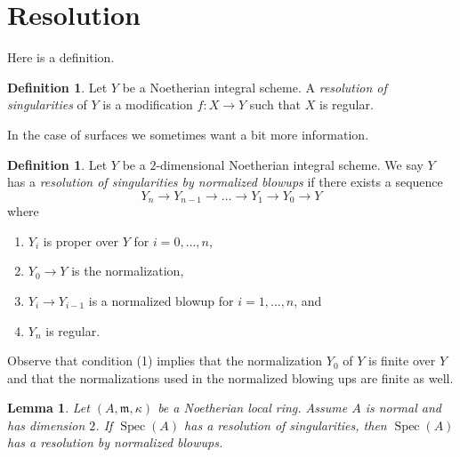 \documentclass{stacks-project}
\theoremstyle{plain}
\newtheorem{lemma}[subsection]{Lemma}
\theoremstyle{definition}
\newtheorem{definition}[subsection]{Definition}
\theoremstyle{remark}
\numberwithin{equation}{subsection}
\def\Spec{\mathop{\mathrm{Spec}}}
\begin{document}
\section{Resolution}
\label{section-resolution}



\noindent
Here is a definition.

\begin{definition}
\label{definition-resolution}
Let $Y$ be a Noetherian integral scheme. A {\it resolution of singularities}
of $Y$ is a modification $f : X \to Y$ such that $X$ is regular.
\end{definition}

\noindent
In the case of surfaces we sometimes want a bit more information.

\begin{definition}
\label{definition-resolution-surface}
Let $Y$ be a $2$-dimensional Noetherian integral scheme.
We say $Y$ has a {\it resolution of singularities by normalized blowups}
if there exists a sequence
$$
Y_n \to Y_{n - 1} \to \ldots \to Y_1 \to Y_0 \to Y
$$
where
\begin{enumerate}
\item $Y_i$ is proper over $Y$ for $i = 0, \ldots, n$,
\item $Y_0 \to Y$ is the normalization,
\item $Y_i \to Y_{i - 1}$ is a normalized blowup for $i = 1, \ldots, n$, and
\item $Y_n$ is regular.
\end{enumerate}
\end{definition}

\noindent
Observe that condition (1) implies that the normalization
$Y_0$ of $Y$ is finite over $Y$ and that the normalizations
used in the normalized blowing ups are finite as well.

\begin{lemma}
\label{lemma-existence-implies-existence-by-normalized-blowing-ups}
Let $(A, \mathfrak m, \kappa)$ be a Noetherian local ring.
Assume $A$ is normal and has dimension $2$.
If $\Spec(A)$ has a resolution of singularities,
then $\Spec(A)$ has a resolution by normalized blowups.
\end{lemma}
\end{document}
